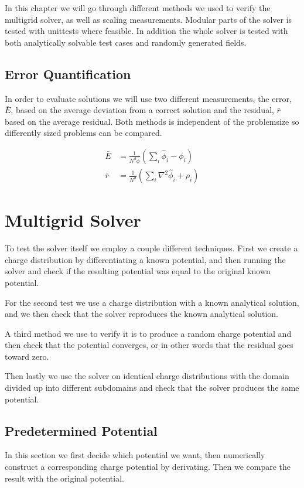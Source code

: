 In this chapter we will go through different methods we used to verify the multigrid
solver, as well as scaling measurements. Modular parts of the solver is tested with unittests
where feasible. In addition the whole solver is tested with both analytically solvable
test cases and randomly generated fields.

\subsection{Error Quantification}
	In order to evaluate solutions we will use two different measurements, the error, \(\bar{E}\), based
	on the average deviation from a correct solution and the residual, \(\bar{r}\) based on the average
	residual. Both methods is independent of the problemsize so differently sized problems can be compared.

	\begin{align}
		\bar{E} &= \frac{1}{N^d\bar{\phi}}\left( \sum_i{\hat{\phi}_i - \phi_i} \right)
		\\
		\bar{r} &= \frac{1}{N^d}\left( \sum_i{ \nabla^2 \hat{\phi}_i + \rho_i  }  \right)
	\end{align}

\section{Multigrid Solver}
	To test the solver itself we employ a couple different techniques. First we
	create a charge distribution by differentiating a known potential, and then
	running the solver and check if the resulting potential was equal to the original
	known potential.

	For the second test we use a charge distribution with a known analytical solution,
	and we then check that the solver reproduces the known analytical solution.

	A third method we use to verify it is to produce a random charge potential
	and then check that the potential converges, or in other words
	that the residual goes toward zero.

	Then lastly we use the solver on identical charge distributions with the domain
	divided up into different subdomains and check that the solver produces the same
	potential.
\subsection{Predetermined Potential}
		In this section we first decide which potential we want, then numerically
		construct a corresponding charge potential by derivating. Then we compare the
		result with the original potential.


